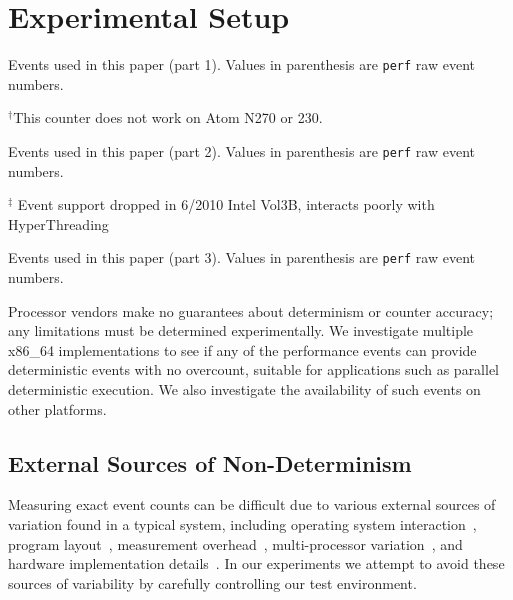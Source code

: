 \section{Experimental Setup}

\begin{tiny}
\begin{table*}[!htpb]
\caption{Events used in this paper (part 1).  
         Values in parenthesis are {\tt perf} raw event numbers.}
\label{table:events1}
\centering
\scriptsize

\hspace{0.2in}$^{\dagger}$This counter does not work on Atom N270 or 230.
\end{table*}
\end{tiny}

\begin{table*}[!htpb]
\caption{Events used in this paper (part 2).  
         Values in parenthesis are {\tt perf} raw event numbers.}
\label{table:events2}
\centering
\scriptsize

\hspace{0.2in}$^{\ddagger}$ Event support dropped in 6/2010
Intel Vol3B, interacts poorly with HyperThreading
\end{table*}

\begin{table*}[!htpb]
\caption{Events used in this paper (part 3).  
         Values in parenthesis are {\tt perf} raw event numbers.}
\label{table:events2}
\centering
\scriptsize

\end{table*}

Processor vendors make no guarantees about determinism or
counter accuracy; any limitations must be determined
experimentally.  
We investigate 
multiple x86\_64 
implementations to see if any of the performance events can
provide deterministic events with no overcount, suitable for
applications such as
parallel deterministic execution.  
We also investigate the availability of such events on
other platforms.

\subsection{External Sources of Non-Determinism}

Measuring exact event counts can be difficult due to various 
external sources of variation found in a typical system, including
operating system interaction~\cite{mcguire+:rtlw09},
program layout~\cite{weaver+:iiswc08,mytkowicz+:asplos09},
measurement overhead~\cite{zaparanuks+:ispass09},
multi-processor variation~\cite{alameldeen+:hpca03}, and
hardware implementation details~\cite{weaver+:iiswc08,weaver:thesis10}.
In our experiments we attempt to avoid these sources of variability by
carefully controlling our test environment.

